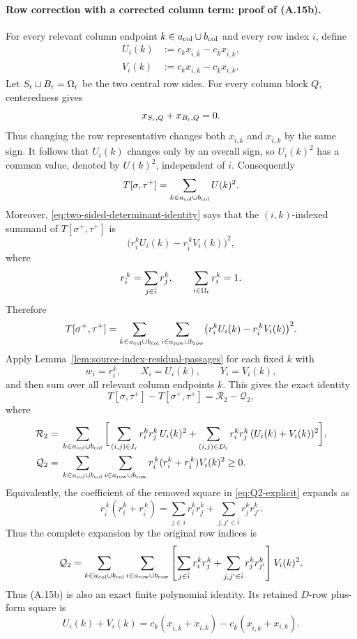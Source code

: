 \documentclass[11pt]{article}
\begin{document}
\paragraph{Row correction with a corrected column term: proof of (A.15b).}
For every relevant column endpoint $k\in a_{\rm col}\cup b_{\rm col}$ and
every row index $i$, define
\begin{align*}
U_i(k)&:=c_kx_{\bar i,\bar k}-c_{\bar k}x_{\bar i,k},\\
V_i(k)&:=c_kx_{i,\bar k}-c_{\bar k}x_{i,k}.
\end{align*}
Let $S_{\rm r}\sqcup B_{\rm r}=\Omega_{\rm r}$ be the two central row
sides.  For every column block $Q$, centeredness gives
\[
x_{S_{\rm r},Q}+x_{B_{\rm r},Q}=0.
\]
Thus changing the row representative changes both
$x_{\bar i,\bar k}$ and $x_{\bar i,k}$ by the same sign.  It follows that
$U_i(k)$ changes only by an overall sign, so $U_i(k)^2$ has a common value,
denoted by $U(k)^2$, independent of $i$.  Consequently
\[
T[\sigma,\tau^+]
=\sum_{k\in a_{\rm col}\cup b_{\rm col}}U(k)^2.
\]
Moreover, \eqref{eq:two-sided-determinant-identity} says that the
$(i,k)$-indexed summand of
$T[\sigma^+,\tau^+]$ is
\[
\bigl(r_i^kU_i(k)-r_{\bar i}^{\,k}V_i(k)\bigr)^2,
\]
where
\[
r_{\bar i}^{\,k}=\sum_{j\in\bar i}r_j^k,
\qquad
\sum_{i\in\Omega_{\rm r}}r_i^k=1.
\]
Therefore
\[
T[\sigma^+,\tau^+]
=\sum_{k\in a_{\rm col}\cup b_{\rm col}}
\sum_{i\in a_{\rm row}\cup b_{\rm row}}
\bigl(r_i^kU_i(k)-r_{\bar i}^{\,k}V_i(k)\bigr)^2.
\]
Apply Lemma~\ref{lem:source-index-residual-passages} for each fixed $k$ with
\[
w_i=r_i^k,
\qquad X_i=U_i(k),
\qquad Y_i=V_i(k),
\]
and then sum over all relevant column endpoints $k$.  This gives the exact
identity
\begin{equation}\label{eq:exact-neighbor-residual-entry}
T[\sigma,\tau^+]-T[\sigma^+,\tau^+]
=\mathcal R_2-\mathcal Q_2,
\tag{A.15b}
\end{equation}
where
\begin{align}
\mathcal R_2
={}&\sum_{k\in a_{\rm col}\cup b_{\rm col}}
\bigg[
\sum_{(i,j)\in I_{\rm r}}r_i^kr_j^k\,U_i(k)^2
+\sum_{(i,j)\in D_{\rm r}}r_i^kr_j^k\,(U_i(k)+V_i(k))^2
\bigg],
\label{eq:R2-explicit}\\
\mathcal Q_2
={}&\sum_{k\in a_{\rm col}\cup b_{\rm col}}
\sum_{i\in a_{\rm row}\cup b_{\rm row}}
r_{\bar i}^{\,k}(r_i^k+r_{\bar i}^{\,k})V_i(k)^2
\ge0.
\label{eq:Q2-explicit}
\end{align}
Equivalently, the coefficient of the removed square in
\eqref{eq:Q2-explicit} expands as
\[
r_{\bar i}^{\,k}(r_i^k+r_{\bar i}^{\,k})
=\sum_{j\in\bar i}r_i^kr_j^k
+\sum_{j,j'\in\bar i}r_j^kr_{j'}^k.
\]
Thus the complete expansion by the original row indices is
\[
\mathcal Q_2
=\sum_{k\in a_{\rm col}\cup b_{\rm col}}
\sum_{i\in a_{\rm row}\cup b_{\rm row}}
\left[
\sum_{j\in\bar i}r_i^kr_j^k
+\sum_{j,j'\in\bar i}r_j^kr_{j'}^k
\right]V_i(k)^2.
\]
Thus (A.15b) is also an exact finite polynomial identity.  Its retained
$D$-row plus-form square is
\begin{equation}\label{eq:correct-D-neighboring-form}
U_i(k)+V_i(k)
=c_k(x_{\bar i,\bar k}+x_{i,\bar k})
-c_{\bar k}(x_{\bar i,k}+x_{i,k}).
\end{equation}
\end{document}
